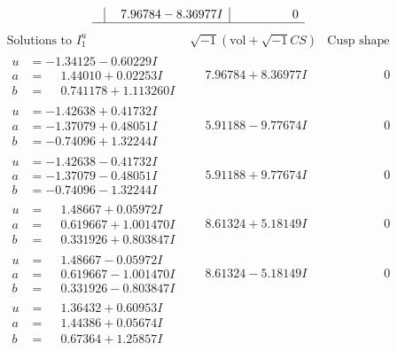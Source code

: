 \documentclass[1p]{elsarticle_modified}
\theoremstyle{definition}
\newcommand{\I}{\sqrt{-1}}
\begin{document}
$$\begin{array}{c|c|c}
 & \phantom{-}7.96784 - 8.36977 I & \phantom{-0.000000 } 0\\
 \hline 
 \end{array}$$\newpage$$\begin{array}{c|c|c}  
\text{Solutions to }I^u_{1}& \I (\text{vol} + \sqrt{-1}CS) & \text{Cusp shape}\\
 \hline 
\begin{aligned}
u &= -1.34125 - 0.60229 I \\
a &= \phantom{-}1.44010 + 0.02253 I \\
b &= \phantom{-}0.741178 + 1.113260 I\end{aligned}
 & \phantom{-}7.96784 + 8.36977 I & \phantom{-0.000000 } 0 \\ \hline\begin{aligned}
u &= -1.42638 + 0.41732 I \\
a &= -1.37079 + 0.48051 I \\
b &= -0.74096 + 1.32244 I\end{aligned}
 & \phantom{-}5.91188 - 9.77674 I & \phantom{-0.000000 } 0 \\ \hline\begin{aligned}
u &= -1.42638 - 0.41732 I \\
a &= -1.37079 - 0.48051 I \\
b &= -0.74096 - 1.32244 I\end{aligned}
 & \phantom{-}5.91188 + 9.77674 I & \phantom{-0.000000 } 0 \\ \hline\begin{aligned}
u &= \phantom{-}1.48667 + 0.05972 I \\
a &= \phantom{-}0.619667 + 1.001470 I \\
b &= \phantom{-}0.331926 + 0.803847 I\end{aligned}
 & \phantom{-}8.61324 + 5.18149 I & \phantom{-0.000000 } 0 \\ \hline\begin{aligned}
u &= \phantom{-}1.48667 - 0.05972 I \\
a &= \phantom{-}0.619667 - 1.001470 I \\
b &= \phantom{-}0.331926 - 0.803847 I\end{aligned}
 & \phantom{-}8.61324 - 5.18149 I & \phantom{-0.000000 } 0 \\ \hline\begin{aligned}
u &= \phantom{-}1.36432 + 0.60953 I \\
a &= \phantom{-}1.44386 + 0.05674 I \\
b &= \phantom{-}0.67364 + 1.25857 I\end{aligned}

\end{array}$$
\end{document}

